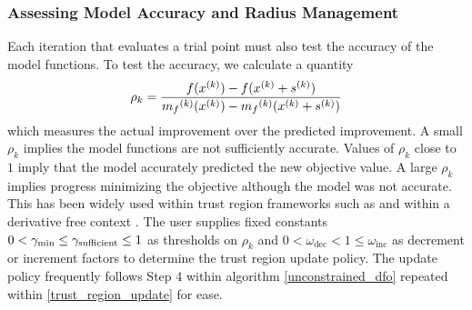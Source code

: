 

\subsubsection{Assessing Model Accuracy and Radius Management}

Each iteration that evaluates a trial point must also test the accuracy of the model functions.
To test the accuracy, we calculate a quantity
\begin{equation}
\label{rho}
\rho_k = \frac{f({x^{(k)}}) - f({x^{(k)}}+{{s}^{(k)}})}{{{m}_f}^{(k)}({x^{(k)}}) - {{m}_f}^{(k)}({x^{(k)}}+{{s}^{(k)}})}
\end{equation}
which measures the actual improvement over the predicted improvement.
A small $\rho_k$ implies the model functions are not sufficiently accurate.
Values of $\rho_k$ close to $1$ imply that the model accurately predicted the new objective value.
A large $\rho_k$ implies progress minimizing the objective although the model was not accurate.
This has been widely used within trust region frameworks such as \cite{Conn:2000:TM:357813} and within a derivative free context \cite{DUMMY:intro_book}.
The user supplies fixed constants $0 < \gamma_{\text{min}} \le \gamma_{\text{sufficient}} \le 1$ as thresholds on $\rho_k$ and $0 < \omega_{\text{dec}} < 1 \le \omega_{\text{inc}}$ as decrement or increment factors to determine the trust region update policy.
The update policy frequently follows Step 4 within algorithm \cref{unconstrained_dfo} repeated within \cref{trust_region_update} for ease.

